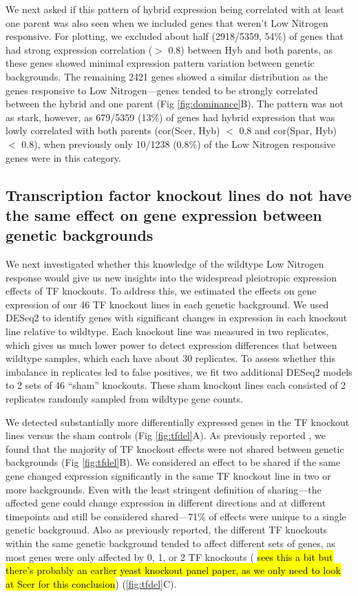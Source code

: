 We next asked if this pattern of hybrid expression being correlated with at least one parent was also seen when we included genes that weren't Low Nitrogen responsive. For plotting, we excluded about half (2918/5359, 54\%) of genes that had strong expression correlation ($>$ 0.8) between Hyb and both parents, as these genes showed minimal expression pattern variation between genetic backgrounds. The remaining 2421 genes showed a similar distribution as the genes responsive to Low Nitrogen---genes tended to be strongly correlated between the hybrid and one parent (Fig \ref{fig:dominance}B). The pattern was not as stark, however, as 679/5359 (13\%) of genes had hybrid expression that was lowly correlated with both parents (cor(Scer, Hyb) $<$ 0.8 and cor(Spar, Hyb) $<$ 0.8), when previously only 10/1238 (0.8\%) of the Low Nitrogen responsive genes were in this category.

\subsection{Transcription factor knockout lines do not have the same effect on gene expression between genetic backgrounds}

We next investigated whether this knowledge of the wildtype Low Nitrogen response would give us new insights into the widespread pleiotropic expression effects of TF knockouts. To address this, we estimated the effects on gene expression of our 46 TF knockout lines in each genetic background. We used DESeq2 \cite{Love2014} to identify genes with significant changes in expression in each knockout line relative to wildtype. Each knockout line was measured in two replicates, which gives us much lower power to detect expression differences that between wildtype samples, which each have about 30 replicates. To assess whether this imbalance in replicates led to false positives, we fit two additional DESeq2 models to 2 sets of 46 ``sham'' knockouts. These sham knockout lines each consisted of 2 replicates randomly sampled from wildtype gene counts.

We detected substantially more differentially expressed genes in the TF knockout lines versus the sham controls (Fig \ref{fig:tfdel}A). As previously reported \cite{Liu2024, Li2025}, we found that the majority of TF knockout effects were not shared between genetic backgrounds (Fig \ref{fig:tfdel}B). We considered an effect to be shared if the same gene changed expression significantly in the same TF knockout line in two or more backgrounds. Even with the least stringent definition of sharing---the affected gene could change expression in different directions and at different timepoints and still be considered shared---71\% of effects were unique to a single genetic background. Also as previously reported, the different TF knockouts within the same genetic background tended to affect different sets of genes, as most genes were only affected by 0, 1, or 2 TF knockouts (\cite{Liu2024} \hl{sees this a bit but there's probably an earlier yeast knockout panel paper, as we only need to look at Scer for this conclusion}) (\ref{fig:tfdel}C).

